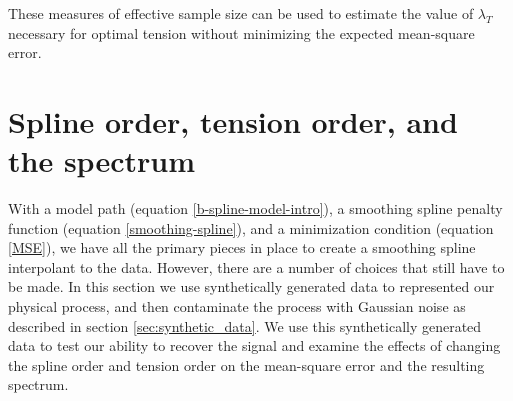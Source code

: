 \documentclass[10pt,journal]{IEEEtran}
\begin{document}
These measures of effective sample size can be used to estimate the value of $\lambda_T$ necessary for optimal tension without minimizing the expected mean-square error. 



%
\section{Spline order, tension order, and the spectrum} \label{sec:spline_order_tension_order_spectrum}
%

With a model path (equation \ref{b-spline-model-intro}), a smoothing spline penalty function (equation \ref{smoothing-spline}), and a minimization condition (equation \ref{MSE}), we have all the primary pieces in place to create a smoothing spline interpolant to the data. However, there are a number of choices that still have to be made. In this section we use synthetically generated data to represented our physical process, and then contaminate the process with Gaussian noise as described in section \ref{sec:synthetic_data}. We use this synthetically generated data to test our ability to recover the signal and examine the effects of changing the spline order and tension order on the mean-square error and the resulting spectrum.
\end{document}

